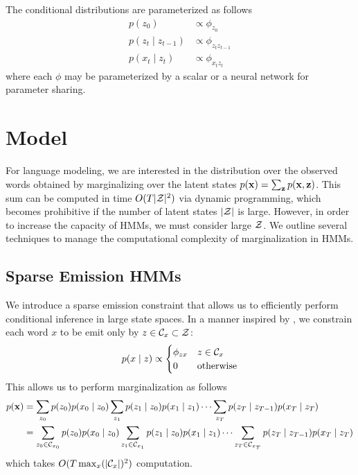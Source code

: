 \documentclass[12pt]{article}
\begin{document}
The conditional distributions are parameterized as follows
\begin{equation}
\label{param}
\begin{aligned}
p(z_0) &\propto \phi_{z_0}\\
p(z_t \mid z_{t-1}) &\propto \phi_{z_tz_{t-1}}\\
p(x_t \mid z_t) &\propto \phi_{x_tz_t}
\end{aligned}
\end{equation}
where each $\phi$ may be parameterized by a scalar or a neural network for parameter sharing.

\section{Model}
For language modeling, we are interested in the distribution over the observed words
obtained by marginalizing over the latent states $p(\mathbf{x}) = \sum_{\mathbf{z}}p(\mathbf{x},\mathbf{z})$.
This sum can be computed in time $O(T|\mathcal{Z}|^2)$ via dynamic programming,
which becomes prohibitive if the number of latent states $|\mathcal{Z}|$ is large.
However, in order to increase the capacity of HMMs, we must consider large $\mathcal{Z}$.
We outline several techniques to manage the computational complexity of marginalization in HMMs.  

\subsection{Sparse Emission HMMs}
We introduce a sparse emission constraint that allows us to
efficiently perform conditional inference in large state spaces.
In a manner inspired by \citet{dedieu2019learning},
we constrain each word $x$ to be emit only by $z \in \mathcal{C}_x \subset \mathcal{Z}$:
\begin{equation}
\label{eqn:sparse_emission}
p(x \mid z) \propto \begin{cases}
\phi_{zx} & z \in \mathcal{C}_x \\
0 & \textrm{otherwise}
\end{cases}
\end{equation}
This allows us to perform marginalization as follows
\begin{equation}
\label{eqn:sparse_marginalization}
\begin{aligned}
p(\mathbf{x}) &= \sum_{z_0} p(z_0)p(x_0 \mid z_0)
    \sum_{z_1}p(z_1\mid z_0)p(x_1 \mid z_1)\cdots
    \sum_{z_T}p(z_T \mid z_{T-1})p(x_T \mid z_T)\\
&= \sum_{z_0 \in \mathcal{C}_{x_0}} p(z_0)p(x_0 \mid z_0)
    \sum_{z_1 \in \mathcal{C}_{x_1}} p(z_1\mid z_0)p(x_1 \mid z_1)\cdots
    \sum_{z_T \in \mathcal{C}_{x_T}} p(z_T \mid z_{T-1})p(x_T \mid z_T)
\end{aligned}
\end{equation}
which takes $O(T \max_x(|\mathcal{C}_x|)^2)$ computation.
\end{document}
